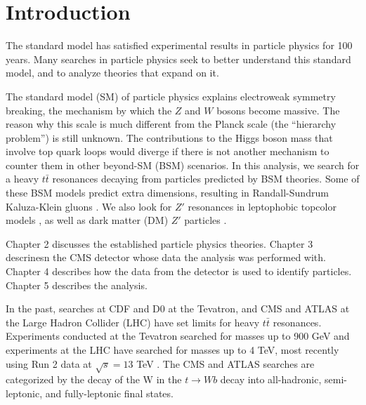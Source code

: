 \chapter{Introduction}\label{chap:intro}


The standard model has satisfied experimental results in particle physics for 100 years. Many searches in particle physics seek to better understand this standard model, and to analyze theories that expand on it.


The standard model (SM) of particle physics explains electroweak symmetry breaking, the mechanism by which the $Z$ and $W$ bosons become massive. The reason why this scale is much different from the Planck scale (the ``hierarchy problem'') is still unknown. The contributions to the Higgs boson mass that involve top quark loops would diverge if there is not another mechanism to counter them in other beyond-SM (BSM) scenarios. In this analysis, we search for a heavy  $t\bar{t}$ resonances decaying from particles predicted by BSM theories. Some of these BSM models predict extra dimensions, resulting in Randall-Sundrum Kaluza-Klein gluons \cite{ExtraDim}. We also look for $Z'$ resonances in leptophobic topcolor models \cite{leptophobicZprime, Zprimettxs, ZprimeCoupledtoGen3, WarpedGaugeBosons}, as well as dark matter (DM) $Z'$ particles \cite{wasmer_dark_matter}.

Chapter 2 discusses the established particle physics theories. Chapter 3 descrinesn the CMS detector whose data the analysis was performed with. Chapter 4 describes how the data from the detector is used to identify particles. Chapter 5 describes the analysis.


In the past, searches at CDF and D0 at the Tevatron, and CMS and ATLAS at the Large Hadron Collider (LHC) have set limits for heavy $t\bar{t}$ resonances. Experiments conducted at the Tevatron searched for masses up to 900 GeV \cite{cdftt3, d0tt} and experiments at the LHC have searched for masses up to 4 TeV, most recently using Run 2 data at $\sqrt{s} = 13$ TeV \cite{7tevZprime_CMSAllHad, 7tevZprime_CMSSemilept, 7tevZprime_ATLASAllHad, 7tevZprime_ATLASSemilept, 8tevZprime_CMSAllHad, 8tevZprime_CMSAllHadSemilept, 8tevZprime_CMSAllHadSemileptLept, 8tevZprime_ATLASSemilept, AN-2016-459}. The CMS and ATLAS searches are categorized by the decay of the W in the $t \rightarrow W b$ decay into all-hadronic, semi-leptonic, and fully-leptonic final states.


